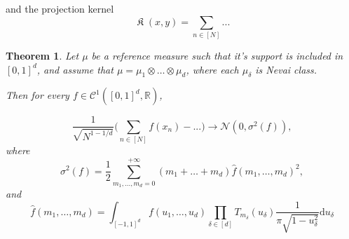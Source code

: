 \documentclass[twoside,11pt]{book}
\newtheorem{theorem}{Theorem}
\DeclareMathOperator*{\KDPP}{\mathfrak{K}}
\begin{document}
and the projection kernel
\begin{equation}
\KDPP(x,y) = \sum\limits_{n \in [N]} ...
\end{equation} 

\begin{theorem}
Let $\mu$ be a reference measure such that it's support is included in $[0,1]^{d}$, and assume that $\mu = \mu_{1} \otimes \dots \otimes \mu_{d}$, where each $\mu_{\delta}$ is Nevai class. 


Then for every $f \in \mathcal{C}^{1}([0,1]^{d}, \mathbb{R})$,

\begin{equation}
\frac{1}{\sqrt{N^{1-1/d}}} \big( \sum\limits_{n \in [N]}f(x_{n}) - ... \big) \rightarrow \mathcal{N}(0,\sigma^{2}(f)),
\end{equation}
where
\begin{equation}
\sigma^{2}(f) = \frac{1}{2} \sum\limits_{m_{1}, \dots , m_{d} = 0}^{+\infty} (m_{1}+\dots +m_{d}) \hat{f}(m_{1}, \dots, m_{d})^{2},
\end{equation}
and 
\begin{equation}
\hat{f}(m_{1},\dots,m_{d}) = \int_{[-1,1]^{d}} f(u_{1}, \dots, u_{d}) \prod\limits_{\delta \in [d]} T_{m_{\delta}}(u_{\delta}) \frac{1}{\pi \sqrt{1-u_{\delta}^{2}}} \mathrm{d}u_{\delta}
\end{equation}

\end{theorem}
\end{document}
